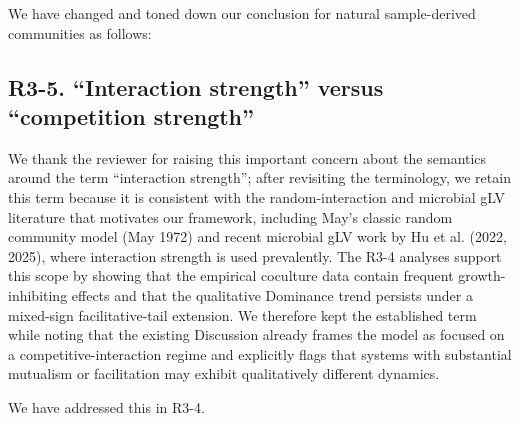 We have changed and toned down our conclusion for natural sample-derived communities as follows: 

\subsection*{R3-5. ``Interaction strength'' versus ``competition strength''}


\responselabel
We thank the reviewer for raising this important concern about the semantics around the term ``interaction strength''; after revisiting the terminology, we retain this term because it is consistent with the random-interaction and microbial gLV literature that motivates our framework, including May's classic random community model (May 1972) and recent microbial gLV work by Hu et al. (2022, 2025), where interaction strength is used prevalently. The R3-4 analyses support this scope by showing that the empirical coculture data contain frequent growth-inhibiting effects and that the qualitative Dominance trend persists under a mixed-sign facilitative-tail extension. We therefore kept the established term while noting that the existing Discussion already frames the model as focused on a competitive-interaction regime and explicitly flags that systems with substantial mutualism or facilitation may exhibit qualitatively different dynamics.


\responselabel
We have addressed this in R3-4.

